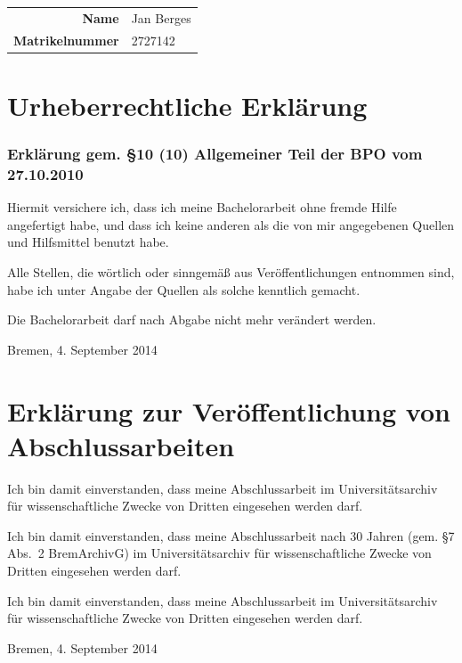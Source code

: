 \documentclass[a4paper, 10pt, twoside, openany]{book} %
\begin{document}
	\bigskip
	
	\begin{flushright}
		\begin{tabular}{r l}
			\textbf{Name} & Jan Berges \\
			\textbf{Matrikelnummer} & 2727142
		\end{tabular}
	\end{flushright}
	
	\bigskip
	
	\section*{Urheberrechtliche Erklärung}

	\subsubsection*{Erklärung gem. \S 10 (10) Allgemeiner Teil der BPO vom 27.10.2010}
	
	Hiermit versichere ich, dass ich meine Bachelorarbeit ohne fremde Hilfe angefertigt habe, und dass ich keine anderen als die von mir angegebenen Quellen und Hilfsmittel benutzt habe.
	
	Alle Stellen, die wörtlich oder sinngemäß aus Veröffentlichungen entnommen sind, habe ich unter Angabe der Quellen als solche kenntlich gemacht.

	Die Bachelorarbeit darf nach Abgabe nicht mehr verändert werden.
	
	\vspace{1cm}

	\begin{flushright}
		Bremen, 4. September 2014
	\end{flushright}
	
	\vspace{1cm}
	
	\section*{Erklärung zur Veröffentlichung von Abschlussarbeiten}

	Ich bin damit einverstanden, dass meine Abschlussarbeit im Universitätsarchiv für wissenschaftliche Zwecke von Dritten eingesehen werden darf.
	
	Ich bin damit einverstanden, dass meine Abschlussarbeit nach 30 Jahren (gem. \S 7 Abs.~2 \mbox{BremArchivG}) im Universitätsarchiv für wissenschaftliche Zwecke von Dritten eingesehen werden darf.
	
	Ich bin damit einverstanden, dass meine Abschlussarbeit im Universitätsarchiv für wissenschaftliche Zwecke von Dritten eingesehen werden darf.
	
	\vspace{1cm}
	
	\begin{flushright}
		Bremen, 4. September 2014
	\end{flushright}
	
	\listoffigures
	
	
	
\end{document}
